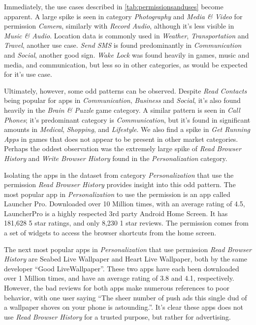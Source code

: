 Immediately, the use cases described in \ref{tab:permissionsanduses} become apparent. A large spike is seen in category \textit{Photography} and \textit{Media \& Video} for permission \textit{Camera}, similarly with \textit{Record Audio}, although it's less visible in \textit{Music \& Audio}. Location data is commonly used in \textit{Weather}, \textit{Transportation} and \textit{Travel}, another use case. \textit{Send SMS} is found predominantly in \textit{Communication} and \textit{Social}, another good sign. \textit{Wake Lock} was found heavily in games, music and media, and communication, but less so in other categories, as would be expected for it's use case.

Ultimately, however, some odd patterns can be observed. Despite \textit{Read Contacts} being popular for apps in \textit{Communication}, \textit{Business} and \textit{Social}, it's also found heavily in the \textit{Brain \& Puzzle} game category. A similar pattern is seen in \textit{Call Phones}; it's predominant category is \textit{Communication}, but it's found in significant amounts in \textit{Medical}, \textit{Shopping}, and \textit{Lifestyle}. We also find a spike in \textit{Get Running Apps} in games that does not appear to be present in other market categories. Perhaps the oddest observation was the extremely large spike of \textit{Read Browser History} and \textit{Write Browser History} found in the \textit{Personalization} category.

Isolating the apps in the dataset from category \textit{Personalization} that use the permission \textit{Read Browser History} provides insight into this odd pattern. The most popular app in \textit{Personalization} to use the permission is an app called Launcher Pro\citep{launcherpro}. Downloaded over 10 Million times, with an average rating of 4.5, LauncherPro is a highly respected 3rd party Android Home Screen. It has 181,628 5 star ratings, and only 8,230 1 star reviews. The permission comes from a set of widgets to access the browser shortcuts from the home screen.

\begin{sloppypar}
The next most popular apps in \textit{Personalization} that use permission \textit{Read Browser History} are Seabed Live Wallpaper\citep{seabedlivewallpaper} and Heart Live Wallpaper\citep{heartlivewallpaper}, both by the same developer ``Good LiveWallpaper''\citep{goodlivewallpaper}. These two apps have each been downloaded over 1 Million times, and have an average rating of 3.8 and 4.1, respectively. However, the bad reviews for both apps make numerous references to poor behavior, with one user saying ``The sheer number of push ads this single dud of a wallpaper shoves on your phone is astounding.''\citep{seabedlivewallpaper}. It's clear these apps does not use \textit{Read Browser History} for a trusted purpose, but rather for advertising.
\end{sloppypar}

